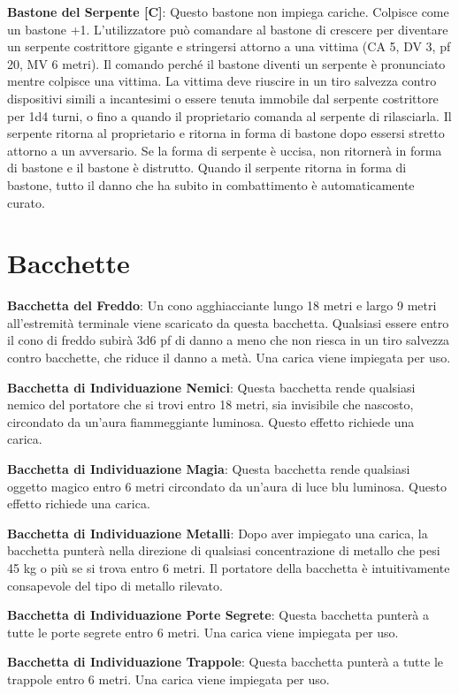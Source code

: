 \documentclass{article}
\begin{document}
\begin{multicols}{2}
\textbf{Bastone del Serpente [C]}: Questo bastone non impiega cariche. Colpisce come un bastone +1. L'utilizzatore può comandare al bastone di crescere per diventare un serpente costrittore gigante e stringersi attorno a una vittima (CA 5, DV 3, pf 20, MV 6 metri). Il comando perché il bastone diventi un serpente è pronunciato mentre colpisce una vittima. La vittima deve riuscire in un tiro salvezza contro dispositivi simili a incantesimi o essere tenuta immobile dal serpente costrittore per 1d4 turni, o fino a quando il proprietario comanda al serpente di rilasciarla. Il serpente ritorna al proprietario e ritorna in forma di bastone dopo essersi stretto attorno a un avversario. Se la forma di serpente è uccisa, non ritornerà in forma di bastone e il bastone è distrutto. Quando il serpente ritorna in forma di bastone, tutto il danno che ha subito in combattimento è automaticamente curato.

\section{Bacchette}

\textbf{Bacchetta del Freddo}: Un cono agghiacciante lungo 18 metri e largo 9 metri all'estremità terminale viene scaricato da questa bacchetta. Qualsiasi essere entro il cono di freddo subirà 3d6 pf di danno a meno che non riesca in un tiro salvezza contro bacchette, che riduce il danno a metà. Una carica viene impiegata per uso.

\textbf{Bacchetta di Individuazione Nemici}: Questa bacchetta rende qualsiasi nemico del portatore che si trovi entro 18 metri, sia invisibile che nascosto, circondato da un'aura fiammeggiante luminosa. Questo effetto richiede una carica.

\textbf{Bacchetta di Individuazione Magia}: Questa bacchetta rende qualsiasi oggetto magico entro 6 metri circondato da un'aura di luce blu luminosa. Questo effetto richiede una carica.

\textbf{Bacchetta di Individuazione Metalli}: Dopo aver impiegato una carica, la bacchetta punterà nella direzione di qualsiasi concentrazione di metallo che pesi 45 kg o più se si trova entro 6 metri. Il portatore della bacchetta è intuitivamente consapevole del tipo di metallo rilevato.

\textbf{Bacchetta di Individuazione Porte Segrete}: Questa bacchetta punterà a tutte le porte segrete entro 6 metri. Una carica viene impiegata per uso.

\textbf{Bacchetta di Individuazione Trappole}: Questa bacchetta punterà a tutte le trappole entro 6 metri. Una carica viene impiegata per uso.


\end{multicols}
\end{document}
